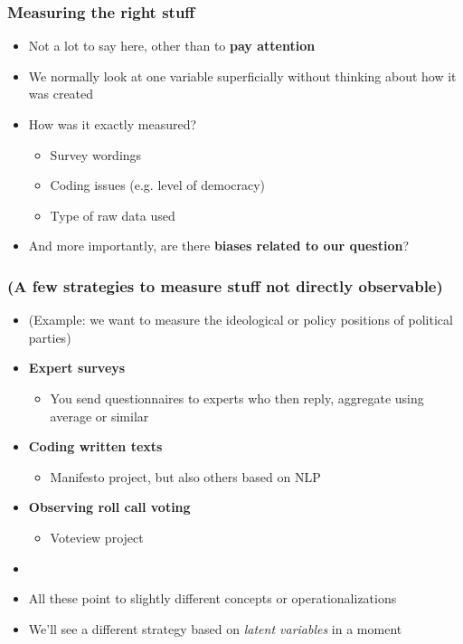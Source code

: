 \documentclass[aspectratio=43]{beamer}
\begin{document}
\begin{frame}
\frametitle{Measuring the right stuff}
\centering

\begin{itemize}
  \item Not a lot to say here, other than to \textbf{pay attention}
  \item We normally look at one variable superficially without thinking about how it was created
  \item How was it exactly measured?
  \begin{itemize}
    \item Survey wordings
    \item Coding issues (e.g. level of democracy)
    \item Type of raw data used
  \end{itemize}
  \item And more importantly, are there \textbf{biases related to our question}?
\end{itemize}

\end{frame}

\begin{frame}
\frametitle{(A few strategies to measure stuff not directly observable)}
\centering

\begin{itemize}
  \item[] (Example: we want to measure the ideological or policy positions of political parties)
  \item \textbf{Expert surveys}
  \begin{itemize}
    \item You send questionnaires to experts who then reply, aggregate using average or similar
  \end{itemize}
  \item \textbf{Coding written texts}
  \begin{itemize}
    \item Manifesto project, but also others based on NLP
  \end{itemize}
  \item \textbf{Observing roll call voting}
  \begin{itemize}
    \item Voteview project
  \end{itemize}
  \item[]
  \item<2-> All these point to slightly different concepts or operationalizations
  \item<3-> We'll see a different strategy based on \textit{latent variables} in a moment
\end{itemize}

\end{frame}
\end{document}
